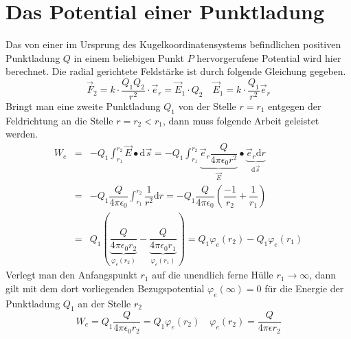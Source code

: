 \section{Das Potential einer Punktladung}
Das von einer im Ursprung des Kugelkoordinatensystems befindlichen positiven Punktladung $Q$ in einem beliebigen Punkt $P$ hervorgerufene Potential wird hier berechnet. Die radial gerichtete Feldstärke ist durch folgende Gleichung gegeben.
\begin{equation}
\boxed{\overrightarrow{F}_2=k\cdot \dfrac{Q_1Q_2}{r^2}\cdot \overrightarrow{e}_r=\overrightarrow{E}_1\cdot Q_2}\quad \boxed{\overrightarrow{E}_1=k\cdot \dfrac{Q_1}{r^2}\overrightarrow{e}_r}
\end{equation}
Bringt man eine zweite Punktladung $Q_1$ von der Stelle $r=r_1$ entgegen der Feldrichtung an die Stelle $r=r_2<r_1$, dann muss folgende Arbeit geleistet werden.
\begin{equation}
\boxed{\begin{array}{lll}
W_e&=&-Q_1\displaystyle \int_{r_1}^{r_2}\overrightarrow{E}\bullet \text{d}\overrightarrow{s}=-Q_1\displaystyle \int_{r_1}^{r_2}\underbrace{\overrightarrow{e}_r\dfrac{Q}{4\pi\epsilon_0r^2}}_{\overrightarrow{E}}\bullet \underbrace{\overrightarrow{e}_r\text{d}r}_{\text{d}\overrightarrow{s}}\\
&=&-Q_1\dfrac{Q}{4\pi\epsilon_0}\displaystyle \int_{r_1}^{r_2}\dfrac{1}{r^2}\text{d}r=-Q_1\dfrac{Q}{4\pi\epsilon_0}\left(\dfrac{-1}{r_2}+\dfrac{1}{r_1}\right)\\
&=&Q_1\left(\underbrace{\dfrac{Q}{4\pi\epsilon_0r_2}}_{\varphi_e\left(r_2\right)}-\underbrace{\dfrac{Q}{4\pi\epsilon_0r_1}}_{\varphi_e\left(r_1\right)}\right)=Q_1\varphi_e\left(r_2\right)-Q_1\varphi_e\left(r_1\right)
\end{array}}
\end{equation}
Verlegt man den Anfangspunkt $r_1$ auf die unendlich ferne Hülle $r_1\rightarrow \infty$, dann gilt mit dem dort vorliegenden Bezugspotential $\varphi_e\left(\infty\right)=0$ für die Energie der Punktladung $Q_1$ an der Stelle $r_2$
\begin{equation}
\boxed{W_e=Q_1\dfrac{Q}{4\pi\epsilon_0r_2}=Q_1\varphi_e\left(r_2\right)}\quad \boxed{\varphi_e\left(r_2\right)=\dfrac{Q}{4\pi\epsilon r_2}}
\end{equation}
